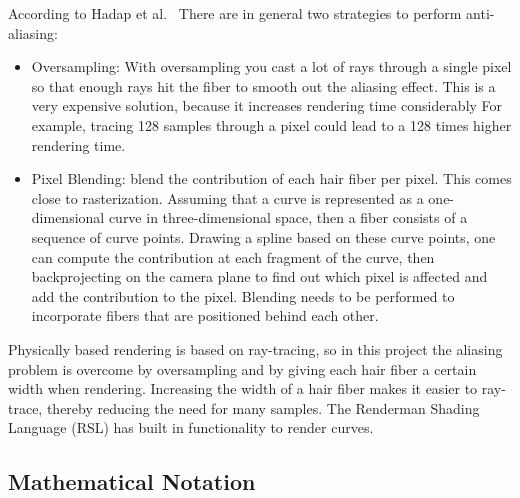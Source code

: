 \documentclass[11pt,a4paper]{report}
\begin{document}
According to Hadap et al.~\cite{hadap} There are in general two strategies to perform anti-aliasing:

\begin{itemize}
\item Oversampling: With oversampling you cast a lot of rays through a single pixel so that enough rays hit the fiber to smooth out the aliasing effect. This is a very expensive solution, because it increases rendering time considerably For example, tracing 128 samples through a pixel could lead to a 128 times higher rendering time.



\item Pixel Blending: blend the contribution of each hair fiber per pixel. This comes close to rasterization. Assuming that a curve is represented as a one-dimensional curve in three-dimensional space, then a fiber consists of a sequence of curve points. Drawing a spline based on these curve points, one can compute the contribution at each fragment of the curve, then backprojecting on the camera plane to find out which pixel is affected and add the contribution to the pixel. Blending needs to be performed to incorporate fibers that are positioned behind each other.

\end{itemize}

Physically based rendering is based on ray-tracing, so in this project the aliasing problem is overcome by oversampling and by giving each hair fiber a certain width when rendering. Increasing the width of a hair fiber makes it easier to ray-trace, thereby reducing the need for many samples. The Renderman Shading Language (RSL) has built in functionality to render curves. 

\subsection{Mathematical Notation}
\end{document}

